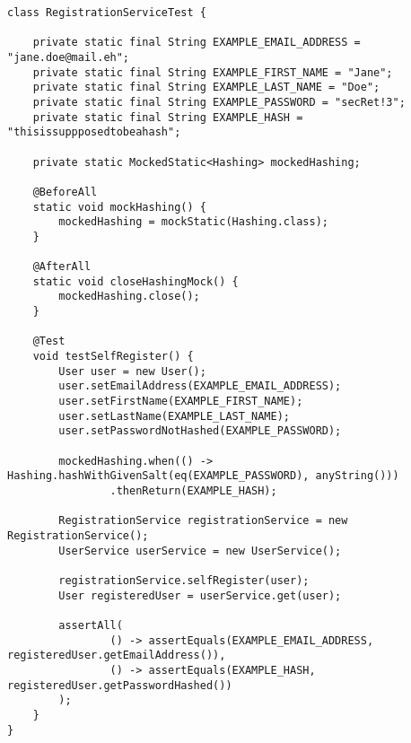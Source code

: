 \begin{lstlisting}[label={lst:SubmissionRegistrationTest},caption={SubmissionRegistrationTest.java}]
class RegistrationServiceTest {

    private static final String EXAMPLE_EMAIL_ADDRESS = "jane.doe@mail.eh";
    private static final String EXAMPLE_FIRST_NAME = "Jane";
    private static final String EXAMPLE_LAST_NAME = "Doe";
    private static final String EXAMPLE_PASSWORD = "secRet!3";
    private static final String EXAMPLE_HASH = "thisissuppposedtobeahash";

    private static MockedStatic<Hashing> mockedHashing;

    @BeforeAll
    static void mockHashing() {
        mockedHashing = mockStatic(Hashing.class);
    }

    @AfterAll
    static void closeHashingMock() {
        mockedHashing.close();
    }

    @Test
    void testSelfRegister() {
        User user = new User();
        user.setEmailAddress(EXAMPLE_EMAIL_ADDRESS);
        user.setFirstName(EXAMPLE_FIRST_NAME);
        user.setLastName(EXAMPLE_LAST_NAME);
        user.setPasswordNotHashed(EXAMPLE_PASSWORD);

        mockedHashing.when(() -> Hashing.hashWithGivenSalt(eq(EXAMPLE_PASSWORD), anyString()))
                .thenReturn(EXAMPLE_HASH);

        RegistrationService registrationService = new RegistrationService();
        UserService userService = new UserService();

        registrationService.selfRegister(user);
        User registeredUser = userService.get(user);

        assertAll(
                () -> assertEquals(EXAMPLE_EMAIL_ADDRESS, registeredUser.getEmailAddress()),
                () -> assertEquals(EXAMPLE_HASH, registeredUser.getPasswordHashed())
        );
    }
}
\end{lstlisting}


